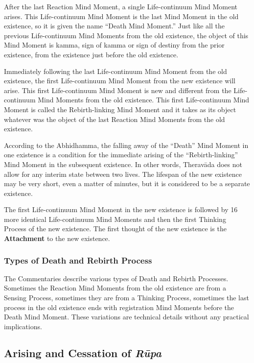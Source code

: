 After the last Reaction Mind Moment, a single Life-continuum Mind Moment arises. This Life-continuum Mind Moment is the last Mind Moment in the old existence, so it is given the name “Death Mind Moment.” Just like all the previous Life-continuum Mind Moments from the old existence, the object of this Mind Moment is kamma, sign of kamma or sign of destiny from the prior existence, from the existence just before the old existence.

Immediately following the last Life-continuum Mind Moment from the old existence, the first Life-continuum Mind Moment from the new existence will arise. This first Life-continuum Mind Moment is new and different from the Life-continuum Mind Moments from the old existence. This first Life-continuum Mind Moment is called the Rebirth-linking Mind Moment and it takes as its object whatever was the object of the last Reaction Mind Moments from the old existence.

According to the Abhidhamma, the falling away of the “Death” Mind Moment in one existence is a condition for the immediate arising of the “Rebirth-linking” Mind Moment in the subsequent existence. In other words, Theravāda does not allow for any interim state between two lives. The lifespan of the new existence may be very short, even a matter of minutes, but it is considered to be a separate existence.

The first Life-continuum Mind Moment in the new existence is followed by 16 more identical Life-continuum Mind Moments and then the first Thinking Process of the new existence. The first thought of the new existence is the \textbf{Attachment} to the new existence.

\subsubsection*{Types of Death and Rebirth Process}

The Commentaries describe various types of Death and Rebirth Processes. Sometimes the Reaction Mind Moments from the old existence are from a Sensing Process, sometimes they are from a Thinking Process, sometimes the last process in the old existence ends with registration Mind Moments before the Death Mind Moment. These variations are technical details without any practical implications.

\subsection*{Arising and Cessation of \textit{Rūpa}}

